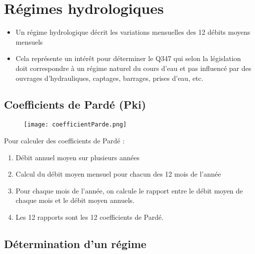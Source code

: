 \section{Régimes hydrologiques}
\begin{itemize}
    \item Un régime hydrologique décrit les variations mensuelles des 12 débits moyens mensuels
    \item Cela représente un intérêt pour déterminer le Q347 qui selon la législation doit correspondre à un régime naturel du cours d'eau et pas influencé par des ouvrages d'hydrauliques, captages, barrages, prises d'eau, etc.
\end{itemize}

\subsection{Coefficients de Pardé (Pki)}
\begin{figure}[H]
    \centering
    \texttt{[image: coefficientParde.png]}
\end{figure}
Pour calculer des coefficients de Pardé :
\begin{enumerate}
    \item Débit annuel moyen sur plusieurs années
    \item Calcul du débit moyen mensuel pour chacun des 12 mois de l'année
    \item Pour chaque mois de l'année, on calcule le rapport entre le débit moyen de chaque mois et le débit moyen annuels.
    \item Les 12 rapports sont les 12 coefficients de Pardé.
\end{enumerate}

\subsection{Détermination d'un régime}
\begin{figure}[H]
    \centering
     \\
     \\
\end{figure}

\begin{figure}[H]
    \hfill
\end{figure}

